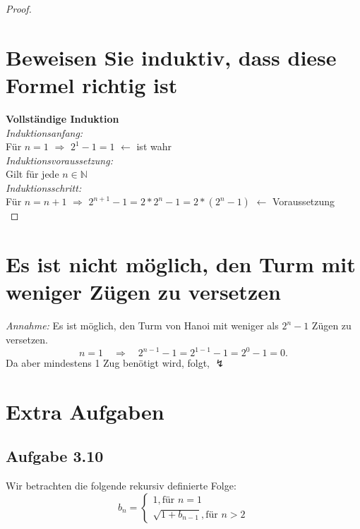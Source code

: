 \documentclass[11pt]{article}
\begin{document}
	\begin{proof}
		\section*{\small Beweisen Sie induktiv, dass diese Formel richtig ist} 
		\vspace{-2mm}
		\textbf{Vollständige Induktion} \\
		[1mm]
		\textit{Induktionsanfang:} \\
		[1mm]
		Für \( n = 1 \) $\Rightarrow$  \( 2^1 - 1 = 1 \) $\longleftarrow$ ist wahr \\
		[1mm]
		\textit{Induktionsvoraussetzung:} \\
		[1mm]
		Gilt für jede \( n \in \mathbb{N} \) \\
		[1mm]
		\textit{Induktionsschritt:} \\
		[1mm]
		Für \( n = n + 1 \) $\Rightarrow$ \( 2^{n + 1} - 1 = 2 * 2^n - 1 = 2*(2^n - 1) \) $\longleftarrow$ Voraussetzung \\
	\end{proof}
	
		\section*{\small Es ist nicht möglich, den Turm mit weniger Zügen zu versetzen}
		\vspace{-2mm}
	\textit{Annahme:} Es ist möglich, den Turm von Hanoi mit weniger als \( 2^n - 1 \) Zügen zu versetzen.  
	 	\vspace{-5pt}
		\[
		n = 1 \quad \Rightarrow \quad 2^{n-1} - 1 = 2^{1-1} - 1 = 2^0 - 1 = 0.
		\]
		Da aber mindestens 1 Zug benötigt wird, folgt, $ \lightning $

    \section{Extra Aufgaben}
    
    \subsection{Aufgabe 3.10} 
Wir betrachten die folgende rekursiv definierte Folge:
$$b_{n} =
\begin{cases} 
    1, \text{für  } n = 1 \\
    \sqrt{1 + b_{n-1}}, \text{für  } n > 2

\end{cases}$$
\end{document}
